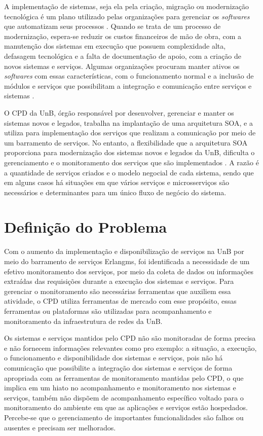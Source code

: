 \label{Introducao}

A implementação de sistemas, seja ela pela criação, migração ou modernização tecnológica é um plano utilizado pelas organizações para gerenciar os \textit{softwares} que automatizam seus processos \cite{Agilar}. Quando se trata de um processo de modernização, espera-se reduzir os custos financeiros de mão de obra, com a manutenção dos sistemas em execução que possuem complexidade alta, defasagem tecnológica e a falta de documentação de apoio, com a criação de novos sistemas e serviços. Algumas organizações procuram manter ativos os \textit{softwares} com essas características, com o funcionamento normal e a inclusão de módulos e serviços que possibilitam a integração e comunicação entre serviços e sistemas \cite{Agilar}.

O \acrlong{CPD} da \acrlong{UnB}, órgão responsável por desenvolver, gerenciar e manter os sistemas novos e legados, trabalha na implantação de uma arquitetura \acrlong{SOA}, e a utiliza para implementação dos serviços que realizam a comunicação por meio de um barramento de serviços. No entanto, a flexibilidade que a arquitetura \acrshort{SOA} proporciona para modernização dos sistemas novos e legados da \acrshort{UnB}, dificulta o gerenciamento e o monitoramento dos serviços que são implementados \cite{Agilar}. A razão é a quantidade de serviços criados e o modelo negocial de cada sistema, sendo que em alguns casos há situações em que vários serviços e microsserviços são necessários e determinantes para um único fluxo de negócio do sistema.


\section{Definição do Problema}
Com o aumento da implementação e disponibilização de serviços na \acrshort{UnB} por meio do barramento de serviços Erlangms\cite{Agilar}, foi identificada a necessidade de um efetivo monitoramento dos serviços, por meio da coleta de dados ou informações extraídas das requisições durante a execução dos sistemas e serviços. Para gerenciar o monitoramento são necessárias ferramentas que auxiliem essa atividade, o \acrshort{CPD} utiliza ferramentas de mercado com esse propósito, essas ferramentas ou plataformas são utilizadas para acompanhamento e monitoramento da infraestrutura de redes da \acrshort{UnB}.

Os sistemas e serviços mantidos pelo \acrshort{CPD} não são monitoradas de forma precisa e não fornecem informações relevantes como pro exemplo: a situação, a execução, o funcionamento e disponibilidade dos sistemas e serviços, pois não há comunicação que possibilite a integração dos sistemas e serviços de forma apropriada com as ferramentas de monitoramento mantidas pelo \acrshort{CPD}, o que implica em um hiato no acompanhamento e monitoramento nos sistemas e serviços, também não dispõem de acompanhamento específico voltado para o monitoramento do ambiente em que as aplicações e serviços estão hospedados. Percebe-se que o gerenciamento de importantes funcionalidades são falhos ou ausentes e precisam ser melhorados.

